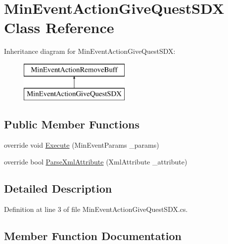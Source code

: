 \hypertarget{class_min_event_action_give_quest_s_d_x}{}\section{Min\+Event\+Action\+Give\+Quest\+S\+DX Class Reference}
\label{class_min_event_action_give_quest_s_d_x}
Inheritance diagram for Min\+Event\+Action\+Give\+Quest\+S\+DX\+:\begin{figure}[H]
\begin{center}
\leavevmode
\includegraphics[height=2.000000cm]{class_min_event_action_give_quest_s_d_x}
\end{center}
\end{figure}
\subsection*{Public Member Functions}
\begin{DoxyCompactItemize}
\item 
override void \mbox{\hyperlink{class_min_event_action_give_quest_s_d_x_a78ac99b8128a088a91bbe259276e1919}{Execute}} (Min\+Event\+Params \+\_\+params)
\item 
override bool \mbox{\hyperlink{class_min_event_action_give_quest_s_d_x_a38e21e977df460d768128b065dd90c7b}{Parse\+Xml\+Attribute}} (Xml\+Attribute \+\_\+attribute)
\end{DoxyCompactItemize}


\subsection{Detailed Description}


Definition at line 3 of file Min\+Event\+Action\+Give\+Quest\+S\+D\+X.\+cs.



\subsection{Member Function Documentation}
\mbox{\label{class_min_event_action_give_quest_s_d_x_a78ac99b8128a088a91bbe259276e1919}} 
